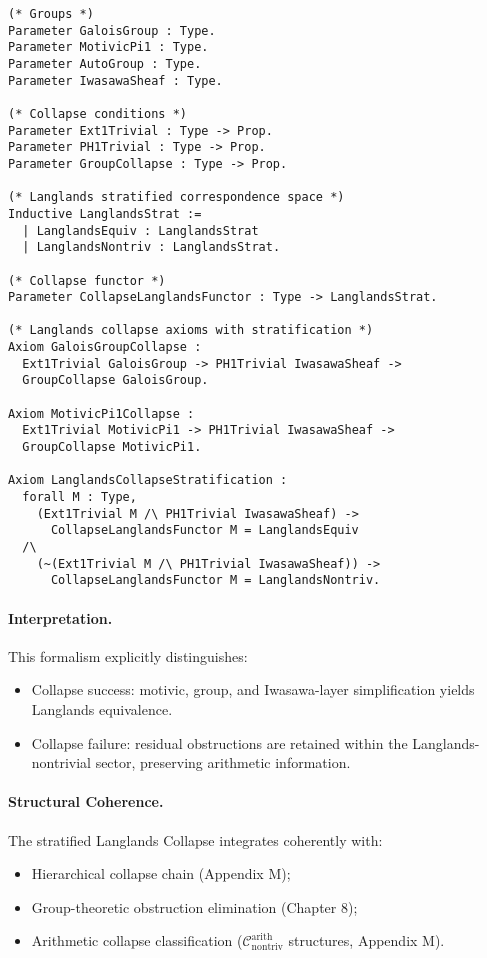 \documentclass[11pt]{article}
\begin{document}
\begin{lstlisting}[language=Coq]
(* Groups *)
Parameter GaloisGroup : Type.
Parameter MotivicPi1 : Type.
Parameter AutoGroup : Type.
Parameter IwasawaSheaf : Type.

(* Collapse conditions *)
Parameter Ext1Trivial : Type -> Prop.
Parameter PH1Trivial : Type -> Prop.
Parameter GroupCollapse : Type -> Prop.

(* Langlands stratified correspondence space *)
Inductive LanglandsStrat :=
  | LanglandsEquiv : LanglandsStrat
  | LanglandsNontriv : LanglandsStrat.

(* Collapse functor *)
Parameter CollapseLanglandsFunctor : Type -> LanglandsStrat.

(* Langlands collapse axioms with stratification *)
Axiom GaloisGroupCollapse :
  Ext1Trivial GaloisGroup -> PH1Trivial IwasawaSheaf ->
  GroupCollapse GaloisGroup.

Axiom MotivicPi1Collapse :
  Ext1Trivial MotivicPi1 -> PH1Trivial IwasawaSheaf ->
  GroupCollapse MotivicPi1.

Axiom LanglandsCollapseStratification :
  forall M : Type,
    (Ext1Trivial M /\ PH1Trivial IwasawaSheaf) ->
      CollapseLanglandsFunctor M = LanglandsEquiv
  /\
    (~(Ext1Trivial M /\ PH1Trivial IwasawaSheaf)) ->
      CollapseLanglandsFunctor M = LanglandsNontriv.
\end{lstlisting}

\paragraph{Interpretation.}

This formalism explicitly distinguishes:

\begin{itemize}
    \item Collapse success: motivic, group, and Iwasawa-layer simplification yields Langlands equivalence.
    \item Collapse failure: residual obstructions are retained within the Langlands-nontrivial sector, preserving arithmetic information.
\end{itemize}

\paragraph{Structural Coherence.}

The stratified Langlands Collapse integrates coherently with:

\begin{itemize}
    \item Hierarchical collapse chain (Appendix M);
    \item Group-theoretic obstruction elimination (Chapter 8);
    \item Arithmetic collapse classification (\( \mathcal{C}_{\mathrm{nontriv}}^{\mathrm{arith}} \) structures, Appendix M).
\end{itemize}
\end{document}
